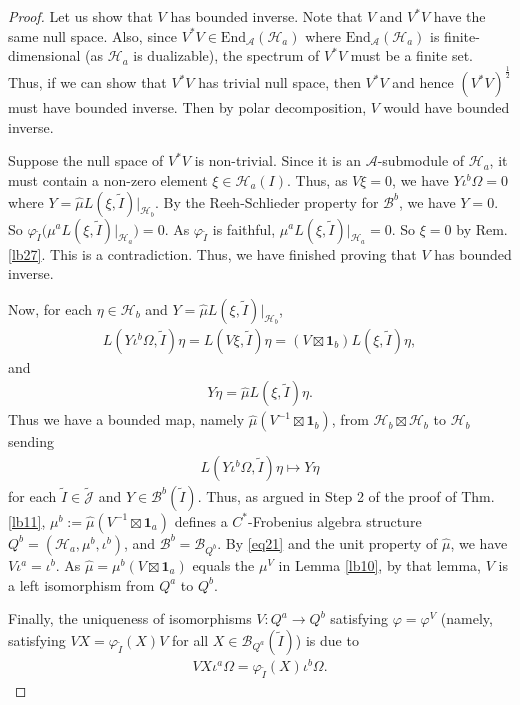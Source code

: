 \documentclass[12pt,a4paper,notitlepage]{article}
\theoremstyle{definition}
\theoremstyle{plain}
\newcommand{\mc}{\mathcal}
\newcommand{\wtd}{\widetilde}
\newcommand{\wht}{\widehat}
\newcommand{\End}{\mathrm{End}} %
\newcommand{\id}{\mathbf{1}}
\newcommand{\Jtd}{\widetilde{\mathcal J}}
\numberwithin{equation}{section}
\begin{document}
\begin{proof}
Let us show that $V$ has bounded inverse. Note that $V$ and $V^*V$ have the same null space. Also, since $V^*V\in\End_{\mc A}(\mc H_a)$ where $\End_{\mc A}(\mc H_a)$ is finite-dimensional (as $\mc H_a$ is dualizable), the spectrum of $V^*V$ must be a finite set. Thus, if we can show that $V^*V$ has trivial null space, then $V^*V$ and hence $(V^*V)^{\frac 12}$ must have bounded inverse. Then by polar decomposition, $V$ would have bounded inverse.

Suppose the null space of $V^*V$ is non-trivial. Since it is an $\mc A$-submodule of $\mc H_a$,  it must contain a non-zero element $\xi\in\mc H_a(I)$. Thus, as $V\xi=0$, we have $Y\iota^b\Omega=0$ where $Y=\wht\mu L(\xi,\wtd I)|_{\mc H_b}$. By the Reeh-Schlieder property for $\mc B^b$, we have $Y=0$. So $\varphi_{\wtd I}\big(\mu^aL(\xi,\wtd I)|_{\mc H_a}\big)=0$. As $\varphi_{\wtd I}$ is faithful, $\mu^a L(\xi,\wtd I)|_{\mc H_a}=0$. So $\xi=0$ by Rem. \ref{lb27}. This is a contradiction. Thus, we have finished proving that $V$ has bounded inverse.

Now, for each $\eta\in\mc H_b$ and $Y=\wht\mu L(\xi,\wtd I)|_{\mc H_b}$,
\begin{align*}
L(Y\iota^b\Omega,\wtd I)\eta=L(V\xi,\wtd I)\eta=(V\boxtimes\id_b)L(\xi,\wtd I)\eta,
\end{align*}
and
\begin{align*}
Y\eta=\wht\mu L(\xi,\wtd I)\eta.	
\end{align*}
Thus we have a bounded map, namely $\wht\mu(V^{-1}\boxtimes\id_b)$, from $\mc H_b\boxtimes\mc H_b$ to $\mc H_b$ sending
\begin{align*}
L(Y\iota^b\Omega,\wtd I)\eta\mapsto Y\eta
\end{align*}
for each $\wtd I\in\Jtd$ and $Y\in\mc B^b(\wtd I)$. Thus, as argued in Step 2 of the proof of Thm. \ref{lb11}, $\mu^b:=\wht\mu(V^{-1}\boxtimes\id_a)$ defines a $C^*$-Frobenius algebra structure $Q^b=(\mc H_a,\mu^b,\iota^b)$, and $\mc B^b=\mc B_{Q^b}$. By \eqref{eq21} and the unit property of $\wht\mu$, we have $V\iota^a=\iota^b$. As $\wht\mu=\mu^b(V\boxtimes\id_a)$ equals the $\mu^V$ in Lemma \ref{lb10}, by that lemma, $V$ is a left isomorphism from $Q^a$ to $Q^b$. 

Finally, the uniqueness of isomorphisms $V:Q^a\rightarrow Q^b$ satisfying $\varphi=\varphi^V$ (namely, satisfying $VX=\varphi_{\wtd I}(X)V$ for all $X\in\mc B_{Q^a}(\wtd I)$) is due to
\begin{align}
VX\iota^a\Omega=\varphi_{\wtd I}(X)\iota^b\Omega.
\end{align}
\end{proof}
\end{document}
